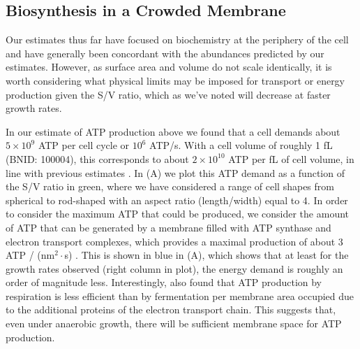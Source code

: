 \subsection{Biosynthesis in a Crowded Membrane}
Our estimates thus far have focused on biochemistry at the periphery of the
cell and have generally been concordant with the abundances predicted by our
estimates.
However, as surface area
and volume do not scale identically, it is worth considering what physical
limits may be imposed for transport or energy production given the S/V ratio, which
as we've noted will decrease at faster growth rates.



In our estimate of ATP production above we found that a cell demands about $5
\times 10^9$ ATP per cell cycle or $10^6$ ATP/s. With a cell volume of roughly 1
fL (BNID: 100004), this corresponds to about $2 \times 10^{10}$ ATP per fL of cell volume, in
line with previous estimates \citep{stouthamer1977, szenk2017}. In
 (A) we plot this ATP demand as a function of the S/V ratio
in green, where we have considered a range of cell shapes from spherical to
rod-shaped with an aspect ratio (length/width) equal to 4. In order to consider
the maximum ATP that could be produced, we consider the amount of ATP that can
be generated by a membrane filled with ATP synthase and electron transport
complexes, which provides a maximal production of about 3 ATP / (nm$^2 \cdot$s)
\citep{szenk2017}. This is shown in blue in (A), which shows
that at least for the growth rates observed (right column in plot), the energy
demand is roughly an order of magnitude less. Interestingly, \cite{szenk2017}
also found that ATP production by respiration is less efficient than by
fermentation per membrane area occupied due to the additional proteins of the
electron transport chain. This suggests that, even under anaerobic growth, there
will be sufficient membrane space for ATP production.

